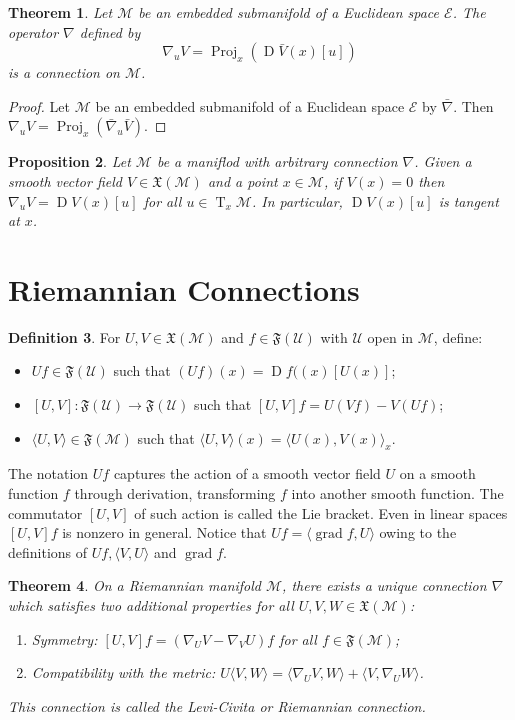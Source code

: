 \documentclass{article}
\theoremstyle{plain}
\newtheorem{theorem}{Theorem}[section]
\newtheorem{proposition}[theorem]{Proposition}
\theoremstyle{definition}
\newtheorem{definition}[theorem]{Definition}
\newcommand{\Tang}[2]{\operatorname{T}_{#1}{\mathcal{#2}}}
\newcommand{\Proj}[2]{\operatorname{Proj}_{#1}{\left(#2\right)}}
\newcommand{\VecF}[1]{\mathfrak{X}(\mathcal{#1})}
\newcommand{\SmFunc}[1]{\mathfrak{F}(\mathcal{#1})}
\newcommand{\Conn}[3]{#1\nabla_{#2}{#3}}
\newcommand{\DirDeri}[3]{\operatorname{D}{#1}(#2)[#3]}
\def\calE{\mathcal{E}}
\def\calM{\mathcal{M}}
\def\calU{\mathcal{U}}
\begin{document}
\begin{theorem}
Let $\calM$ be an embedded submanifold of a Euclidean space $\calE$. The operator $\nabla$ defined by $$\Conn{}{u}{V} = \Proj{x}{\DirDeri{\bar V}{x}{u}} \label{def-conn-proj}$$ is a connection on $\calM$. 
\end{theorem}

\begin{proof}
Let $\calM$ be an embedded submanifold of a Euclidean space $\calE$ by $\bar \nabla$. Then $\nabla_u V = \Proj{x}{\Conn{\bar}{u}{\bar V}}$. 
\end{proof}

\begin{proposition}
Let $\calM$ be a maniflod with arbitrary connection $\nabla$. Given a smooth vector field $V \in \VecF{M}$ and a point $x \in \calM$, if $V(x) = 0$ then $\nabla_u V=\DirDeri{V}{x}{u}$ for all $u\in \Tang{x}{M}$. In particular, $\DirDeri{V}{x}{u}$ is tangent at $x$. 
\end{proposition}

\section{Riemannian Connections}

\begin{definition}
For $U, V \in \VecF{M}$ and $f \in \SmFunc{U}$ with $\calU$ open in $\calM$, define:
\begin{itemize}
\item $Uf \in \SmFunc{U}$ such that $(Uf)(x) = \DirDeri{f(}{x}{U(x)}$;
\item $[U, V]: \SmFunc{U}\to \SmFunc{U}$ such that $[U,V]f = U(Vf) - V(Uf)$;
\item $\langle U, V\rangle \in \SmFunc{M}$ such that $\langle U, V\rangle(x) = \langle U(x), V(x)\rangle_x$. 
\end{itemize}
\end{definition}

The notation $Uf$ captures the action of a smooth vector field $U$ on a smooth function $f$ through derivation, transforming $f$ into another smooth function. 
The commutator $[U,V]$ of such action is called the Lie bracket. Even in linear spaces $[U, V ]f$ is nonzero in general. Notice that $Uf = \langle \operatorname{grad}f, U\rangle$ owing to the definitions of $Uf, \langle V, U\rangle$ and $\operatorname{grad} f$. 

\begin{theorem}
On a Riemannian manifold $\calM$, there exists a unique connection $\nabla$ which satisfies two additional properties for all $U,V,W \in \VecF{M}$:
\begin{enumerate}
\item Symmetry: $[U, V] f = (\Conn{}{U}{V} -\Conn{}{V}{U}) f$ for all $f \in \SmFunc{M}$;
\item Compatibility with the metric: $U\langle V,W\rangle = \langle\Conn{}{U}{V},W\rangle+\langle V,\Conn{}{U}{W}\rangle$.
\end{enumerate}
This connection is called the Levi-Civita or Riemannian connection.
\end{theorem}
\end{document}
